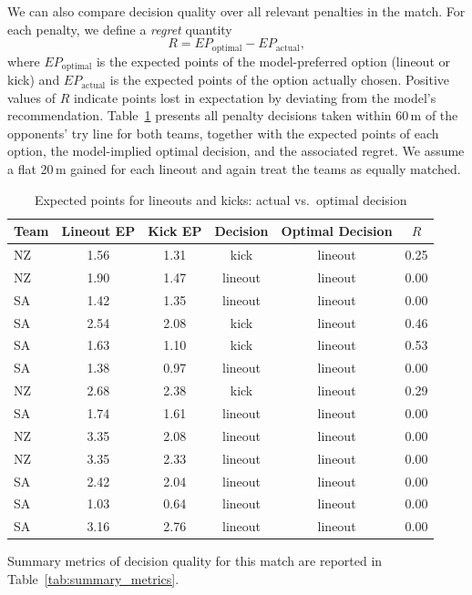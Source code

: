 \documentclass[12pt]{article}
\begin{document}
We can also compare decision quality over all relevant penalties in the match. For each penalty, we define a \emph{regret} quantity
\[
R = EP_{\text{optimal}} - EP_{\text{actual}},
\]
where $EP_{\text{optimal}}$ is the expected points of the model-preferred option (lineout or kick) and $EP_{\text{actual}}$ is the expected points of the option actually chosen. Positive values of $R$ indicate points lost in expectation by deviating from the model’s recommendation. Table~\ref{tab:ep_comparison} presents all penalty decisions taken within 60\,m of the opponents' try line for both teams, together with the expected points of each option, the model-implied optimal decision, and the associated regret. We assume a flat 20\,m gained for each lineout and again treat the teams as equally matched.

\begin{table}[htbp]
\centering
\caption{Expected points for lineouts and kicks: actual vs.\ optimal decision}
\label{tab:ep_comparison}
\begin{tabular}{lccccc}
\hline
Team & Lineout EP & Kick EP & Decision & Optimal Decision & $R$ \\
\hline
NZ & 1.56 & 1.31 & kick     & lineout  & 0.25 \\
NZ & 1.90 & 1.47 & lineout  & lineout  & 0.00 \\
SA & 1.42 & 1.35 & lineout  & lineout  & 0.00 \\
SA & 2.54 & 2.08 & kick     & lineout  & 0.46 \\
SA & 1.63 & 1.10 & kick     & lineout  & 0.53 \\
SA & 1.38 & 0.97 & lineout  & lineout  & 0.00 \\
NZ & 2.68 & 2.38 & kick     & lineout  & 0.29 \\
SA & 1.74 & 1.61 & lineout  & lineout  & 0.00 \\
NZ & 3.35 & 2.08 & lineout  & lineout  & 0.00 \\
NZ & 3.35 & 2.33 & lineout  & lineout  & 0.00 \\
SA & 2.42 & 2.04 & lineout  & lineout  & 0.00 \\
SA & 1.03 & 0.64 & lineout  & lineout  & 0.00 \\
SA & 3.16 & 2.76 & lineout  & lineout  & 0.00 \\
\hline
\end{tabular}
\end{table}

Summary metrics of decision quality for this match are reported in Table~\ref{tab:summary_metrics}.
\end{document}
